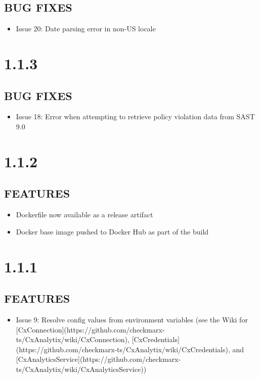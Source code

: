 \subsection*{BUG FIXES}
    \begin{itemize}
        \item Issue 20: Date parsing error in non-US locale
    \end{itemize}

\section{1.1.3}
\subsection*{BUG FIXES}
    \begin{itemize}
        \item Issue 18: Error when attempting to retrieve policy violation data from SAST 9.0
    \end{itemize}


\section{1.1.2}
\subsection*{FEATURES}
    \begin{itemize}
        \item Dockerfile now available as a release artifact
        \item Docker base image pushed to Docker Hub as part of the build 
    \end{itemize}

\section{1.1.1}
\subsection*{FEATURES}
    \begin{itemize}
        \item Issue 9: Resolve config values from environment variables (see the Wiki for [CxConnection](https://github.com/checkmarx-ts/CxAnalytix/wiki/CxConnection), [CxCredentials](https://github.com/checkmarx-ts/CxAnalytix/wiki/CxCredentials), and [CxAnalyticsService](https://github.com/checkmarx-ts/CxAnalytix/wiki/CxAnalyticsService))
    \end{itemize}
